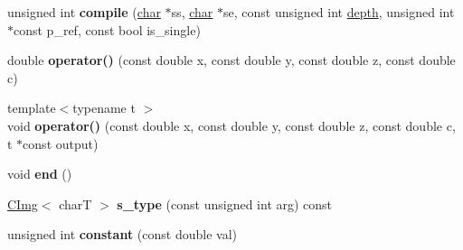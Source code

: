 \begin{DoxyCompactItemize}
\item 
\mbox{\label{structcimg__library__suffixed_1_1CImg_1_1__cimg__math__parser_a318c44c5d1f4f0114355f37ace87a4ae}} 
unsigned int {\bfseries compile} (\hyperlink{classchar}{char} $\ast$ss, \hyperlink{classchar}{char} $\ast$se, const unsigned int \hyperlink{structcimg__library__suffixed_1_1CImg_aa708d2050f866a341896aca528615d2d}{depth}, unsigned int $\ast$const p\+\_\+ref, const bool is\+\_\+single)
\item 
\mbox{\label{structcimg__library__suffixed_1_1CImg_1_1__cimg__math__parser_ac9bcfb16c10b216b5d99c4f3bc17225c}} 
double {\bfseries operator()} (const double x, const double y, const double z, const double c)
\item 
\mbox{\label{structcimg__library__suffixed_1_1CImg_1_1__cimg__math__parser_ae6105cf70f00ad11665a67c23c8e7d29}} 
{\footnotesize template$<$typename t $>$ }\\void {\bfseries operator()} (const double x, const double y, const double z, const double c, t $\ast$const output)
\item 
\mbox{\label{structcimg__library__suffixed_1_1CImg_1_1__cimg__math__parser_a6707c6d516122d4e601391d6d0d608bc}} 
void {\bfseries end} ()
\item 
\mbox{\label{structcimg__library__suffixed_1_1CImg_1_1__cimg__math__parser_a2576c21861d4f00e532fd4c562d07615}} 
\hyperlink{structcimg__library__suffixed_1_1CImg}{C\+Img}$<$ charT $>$ {\bfseries s\+\_\+type} (const unsigned int arg) const
\item 
\mbox{\label{structcimg__library__suffixed_1_1CImg_1_1__cimg__math__parser_a1e4b329d6551265b58f355ea6d2229dd}} 
unsigned int {\bfseries constant} (const double val)
\item 
\mbox{\label{structcimg__library__suffixed_1_1CImg_1_1__cimg__math__parser_a3fbf24a3096da0af2aca688a11feb616}} 

\end{DoxyCompactItemize}
